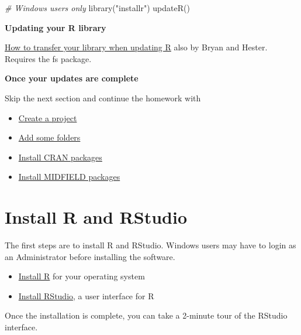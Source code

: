 \documentclass[
]{book}
\newenvironment{Shaded}{\begin{snugshade}}{\end{snugshade}}
\newcommand{\CommentTok}[1]{\textcolor[rgb]{0.56,0.35,0.01}{\textit{#1}}}
\newcommand{\FunctionTok}[1]{\textcolor[rgb]{0.00,0.00,0.00}{#1}}
\newcommand{\NormalTok}[1]{#1}
\newcommand{\StringTok}[1]{\textcolor[rgb]{0.31,0.60,0.02}{#1}}
\providecommand{\tightlist}{%
  \setlength{\itemsep}{0pt}\setlength{\parskip}{0pt}}
\begin{document}
\begin{Shaded}
\begin{Highlighting}[]
    \CommentTok{\# Windows users only}
    \FunctionTok{library}\NormalTok{(}\StringTok{"installr"}\NormalTok{)}
    \FunctionTok{updateR}\NormalTok{()}
\end{Highlighting}
\end{Shaded}

\textbf{Updating your R library}

\href{https://rstats.wtf/maintaining-r.html\#how-to-transfer-your-library-when-updating-r}{How to transfer your library when updating R} also by Bryan and Hester. Requires the fs package.

\textbf{Once your updates are complete}

Skip the next section and continue the homework with

\begin{itemize}
\tightlist
\item
  \protect\hyperlink{create-a-project}{Create a project}\\
\item
  \protect\hyperlink{add-some-folders}{Add some folders}
\item
  \protect\hyperlink{install-cran-packages}{Install CRAN packages}
\item
  \protect\hyperlink{install-midfield-packages}{Install MIDFIELD packages}
\end{itemize}

\hypertarget{install-r-and-rstudio}{%
\section{Install R and RStudio}\label{install-r-and-rstudio}}

The first steps are to install R and RStudio. Windows users may have to login as an Administrator before installing the software.

\begin{itemize}
\tightlist
\item
  \href{https://cloud.r-project.org}{Install R} for your operating system\\
\item
  \href{https://www.rstudio.com/products/rstudio/download/\#download}{Install RStudio}, a user interface for R
\end{itemize}

Once the installation is complete, you can take a 2-minute tour of the RStudio interface.
\end{document}
